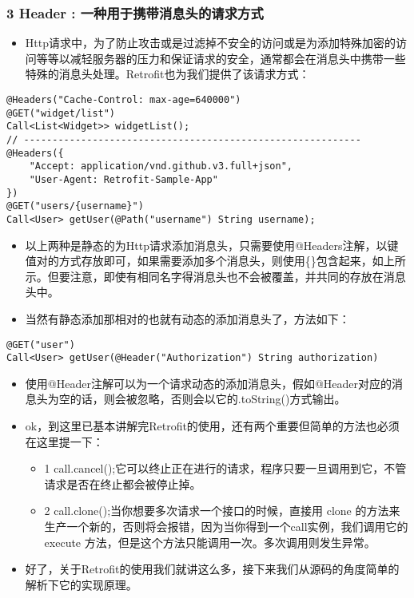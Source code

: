 \documentclass[9pt, b5paper]{article}
\begin{document}
\subsubsection{3 Header : 一种用于携带消息头的请求方式}
\label{sec-1-2-3}
\begin{itemize}
\item Http请求中，为了防止攻击或是过滤掉不安全的访问或是为添加特殊加密的访问等等以减轻服务器的压力和保证请求的安全，通常都会在消息头中携带一些特殊的消息头处理。Retrofit也为我们提供了该请求方式：
\end{itemize}
\begin{verbatim}
@Headers("Cache-Control: max-age=640000")
@GET("widget/list")
Call<List<Widget>> widgetList();
// -----------------------------------------------------------
@Headers({
    "Accept: application/vnd.github.v3.full+json",
    "User-Agent: Retrofit-Sample-App"
})
@GET("users/{username}")
Call<User> getUser(@Path("username") String username);
\end{verbatim}
\begin{itemize}
\item 以上两种是静态的为Http请求添加消息头，只需要使用@Headers注解，以键值对的方式存放即可，如果需要添加多个消息头，则使用\{\}包含起来，如上所示。但要注意，即使有相同名字得消息头也不会被覆盖，并共同的存放在消息头中。
\item 当然有静态添加那相对的也就有动态的添加消息头了，方法如下：
\end{itemize}
\begin{verbatim}
@GET("user")
Call<User> getUser(@Header("Authorization") String authorization)
\end{verbatim}
\begin{itemize}
\item 使用@Header注解可以为一个请求动态的添加消息头，假如@Header对应的消息头为空的话，则会被忽略，否则会以它的.toString()方式输出。
\item ok，到这里已基本讲解完Retrofit的使用，还有两个重要但简单的方法也必须在这里提一下：
\begin{itemize}
\item 1 call.cancel();它可以终止正在进行的请求，程序只要一旦调用到它，不管请求是否在终止都会被停止掉。
\item 2 call.clone();当你想要多次请求一个接口的时候，直接用 clone 的方法来生产一个新的，否则将会报错，因为当你得到一个call实例，我们调用它的 execute 方法，但是这个方法只能调用一次。多次调用则发生异常。
\end{itemize}
\item 好了，关于Retrofit的使用我们就讲这么多，接下来我们从源码的角度简单的解析下它的实现原理。
\end{itemize}
\end{document}
